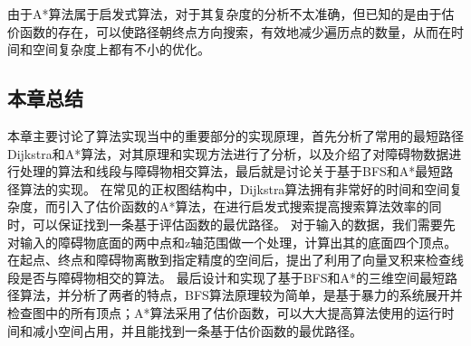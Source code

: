 \par 由于A*算法属于启发式算法，对于其复杂度的分析不太准确，但已知的是由于估价函数的存在，可以使路径朝终点方向搜索，有效地减少遍历点的数量，从而在时间和空间复杂度上都有不小的优化。

\FloatBarrier
\subsection{本章总结}
\par{\kaishu 本章主要讨论了算法实现当中的重要部分的实现原理，首先分析了常用的最短路径Dijkstra和A*算法，对其原理和实现方法进行了分析，以及介绍了对障碍物数据进行处理的算法和线段与障碍物相交算法，最后就是讨论关于基于BFS和A*最短路径算法的实现。
在常见的正权图结构中，Dijkstra算法拥有非常好的时间和空间复杂度，而引入了估价函数的A*算法，在进行启发式搜索提高搜索算法效率的同时，可以保证找到一条基于评估函数的最优路径。
对于输入的数据，我们需要先对输入的障碍物底面的两中点和z轴范围做一个处理，计算出其的底面四个顶点。在起点、终点和障碍物离散到指定精度的空间后，提出了利用了向量叉积来检查线段是否与障碍物相交的算法。
最后设计和实现了基于BFS和A*的三维空间最短路径算法，并分析了两者的特点，BFS算法原理较为简单，是基于暴力的系统展开并检查图中的所有顶点；A*算法采用了估价函数，可以大大提高算法使用的运行时间和减小空间占用，并且能找到一条基于估价函数的最优路径。}